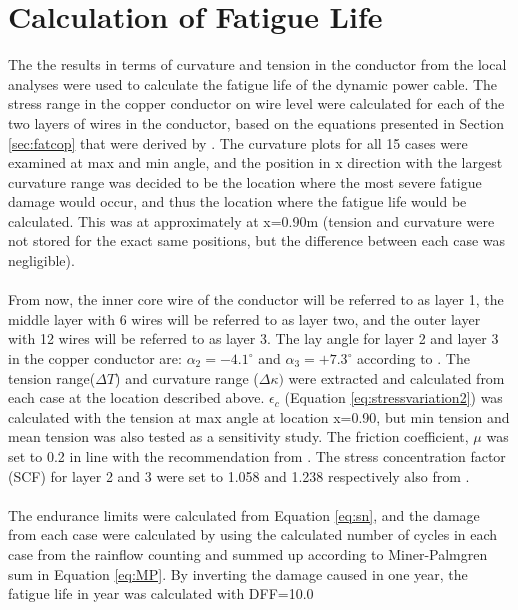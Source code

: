 \section{Calculation of Fatigue Life}
The the results in terms of curvature and tension in the conductor from the local analyses were used to calculate the fatigue life of the dynamic power cable. The stress range in the copper conductor on wire level were calculated for each of the two layers of wires in the conductor, based on the equations presented in Section \ref{sec:fatcop} that were derived by \cite{s300}. The curvature plots for all 15 cases were examined at max and min angle, and the position in x direction with the largest curvature range was decided to be the location where the most severe fatigue damage would occur, and thus the location where the fatigue life would be calculated. This was at approximately at x=0.90m (tension and curvature were not stored for the exact same positions, but the difference between each case was negligible). \\\\
From now, the inner core wire of the conductor will be referred to as layer 1, the middle layer with 6 wires will be referred to as layer two, and the outer layer with 12 wires will be referred to as layer 3. The lay angle for layer 2 and layer 3 in the copper conductor are: $\alpha_2=-4.1^\circ$ and $\alpha_3=+7.3^\circ$ according to \cite{Nasution2013}. The tension range($\Delta T$) and curvature range ($\Delta \kappa)$ were extracted and calculated from each case at the location described above. $\epsilon_c$ (Equation \ref{eq:stressvariation2}) was calculated with the tension at max angle at location x=0.90, but min tension and mean tension was also tested as a sensitivity study. The friction coefficient, $\mu$ was set to 0.2 in line with the recommendation from \cite{NASUTION2014}. The stress concentration factor (SCF) for layer 2 and 3 were set to 1.058 and 1.238 respectively also from \cite{NASUTION2014}. \\\\
The endurance limits were calculated from Equation \ref{eq:sn}, and the damage from each case were calculated by using the calculated number of cycles in each case from the rainflow counting and summed up according to Miner-Palmgren sum in Equation \ref{eq:MP}. By inverting the damage caused in one year, the fatigue life in year was calculated with DFF=10.0





